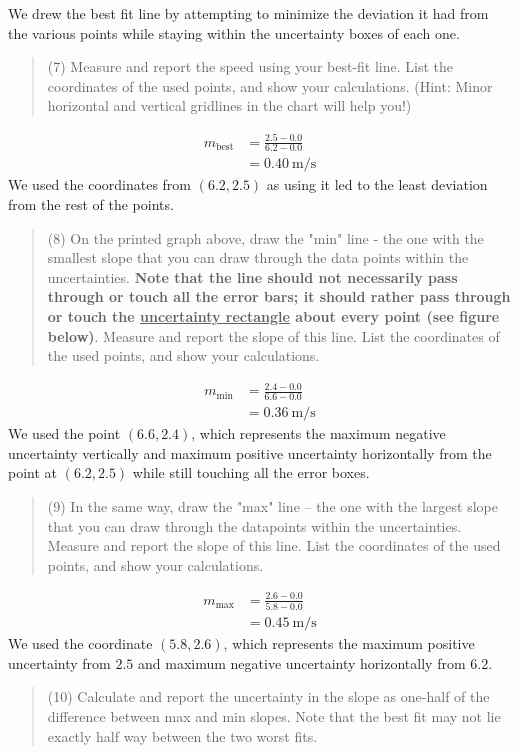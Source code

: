 \documentclass[8pt]{extarticle}
\newcommand{\plain}[1]{\textrm{#1}}
\begin{document}
\noindent We drew the best fit line by attempting to minimize the deviation it had from the various points while staying within the uncertainty boxes of each one.
\begin{quote}
	(7) Measure and report the speed using your best-fit line. List the coordinates of the used points, and show your calculations. (Hint: Minor horizontal and vertical gridlines in the chart will help you!)
\end{quote}
\begin{align*}
	m_{\plain{best}} &= \frac{2.5-0.0}{6.2-0.0} \\
	&= 0.40~\plain{m/s}
\end{align*}
We used the coordinates from $(6.2,2.5)$ as using it led to the least deviation from the rest of the points.
\begin{quote}
	(8) On the printed graph above, draw the "min" line - the one with the smallest slope that you can draw through the data points within the uncertainties. \textbf{Note that the line should not necessarily pass through or touch all the error bars; it should rather pass through or touch the \underline{uncertainty rectangle} about every point (see figure below)}. Measure and report the slope of this line. List the coordinates of the used points, and show your calculations.  
\end{quote}
\begin{align*}
	m_{\plain{min}} &= \frac{2.4-0.0}{6.6-0.0}\\
	&= 0.36~\plain{m/s}
\end{align*}
We used the point $(6.6,2.4)$, which represents the maximum negative uncertainty vertically and maximum positive uncertainty horizontally from the point at $(6.2,2.5)$ while still touching all the error boxes.
\begin{quote}
	(9) In the same way, draw the "max" line -- the one with the largest slope that you can draw through the datapoints within the uncertainties. Measure and report the slope of this line. List the coordinates of the used points, and show your calculations.  
\end{quote}
\begin{align*}
	m_{\plain{max}} &= \frac{2.6-0.0}{5.8-0.0}\\
	&= 0.45~\plain{m/s}
\end{align*}
We used the coordinate $(5.8,2.6)$, which represents the maximum positive uncertainty from $2.5$ and maximum negative uncertainty horizontally from $6.2$.
\begin{quote}
	(10) Calculate and report the uncertainty in the slope as one-half of the difference between max and min slopes. Note that the best fit may not lie exactly half way between the two worst fits.
\end{quote}
\end{document}
